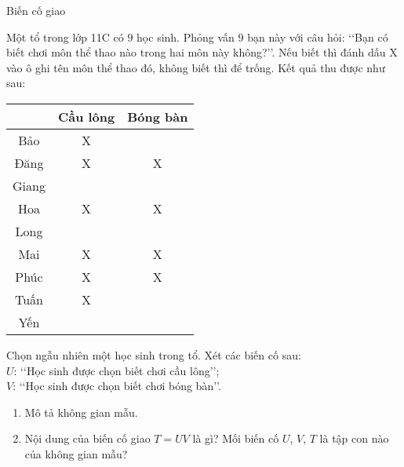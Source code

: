 \begin{dang}{Biến cố giao}
\end{dang}
\begin{vd}%
	Một tổ trong lớp 11C có $9$ học sinh. Phỏng vấn $9$ bạn này với câu hỏi: \lq\lq  Bạn có biết chơi môn thể thao nào trong hai môn này không?\rq\rq. Nếu biết thì đánh dấu X vào ô ghi tên môn thể thao đó, không biết thì để trống. Kết quả thu được như sau:
	\begin{center}
	\begin{tabular}{|c|c|c|}
	\hline
	\diagbox{Tên học sinh}{Môn thể thao} & Cầu lông & Bóng bàn \\
	\hline
	Bảo & X & \\
	\hline
	Đăng & X & X \\
	\hline
	Giang & & \\
	\hline
	Hoa & X & X \\
	\hline
	Long & & \\
	\hline
	Mai & X & X \\
	\hline
	Phúc & X & X \\
	\hline
	Tuấn & X & \\
	\hline
	Yến & & \\
	\hline
	\end{tabular}
	\end{center}
	Chọn ngẫu nhiên một học sinh trong tổ. Xét các biến cố sau:\\	
	$U$: \lq\lq  Học sinh được chọn biết chơi cầu lông\rq\rq;\\
	$V$: \lq\lq  Học sinh được chọn biết chơi bóng bàn\rq\rq.
	\begin{enumerate}
	\item Mô tả không gian mẫu.
	\item Nội dung của biến cố giao $T=U V$ là gì? Mối biến cố $U$, $V$, $T$ là tập con nào của không gian mẫu?
	\end{enumerate}
\end{vd}
